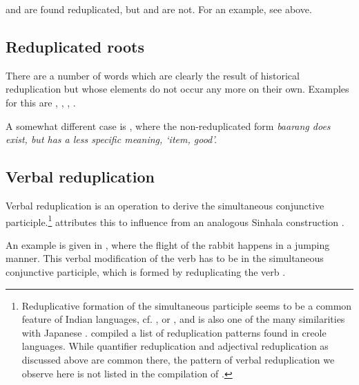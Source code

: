 
 and  are found reduplicated, but  and  are not. For an example, see  above.

\subsection{Reduplicated roots}\label{sec:wofo:Reduplicatedroots}
There are a number of words which are clearly the result of historical reduplication but whose elements do not occur any more on their own. Examples for this are 
,
,
,
.

A somewhat different case is , where the non-reduplicated form \em baarang \em does exist, but has a less specific meaning, `item, good'.


\subsection{Verbal reduplication}\label{sec:wofo:Verbalreduplication}
Verbal reduplication  is an operation to derive the simultaneous conjunctive participle.\footnote{Reduplicative
 formation of the simultaneous participle seems to be a common feature of Indian languages, cf. \citet[10,35]{Abbi1994}, or \citet{Singh2005redup}, and is also one of the many similarities with Japanese \citep{Shibasaki2005redup}. \citet{BakkerEtAl2005redup} compiled a list of reduplication patterns found in creole languages. While quantifier reduplication and adjectival reduplication as discussed above are common there, the pattern of verbal reduplication we observe here is not listed in the compilation of \citet{BakkerEtAl2005redup}.}
\citet[56]{Saldin2001} attributes this to influence from an analogous Sinhala construction \citep[cf.][88]{Garusinghe1962}.


An example is given in , where the flight of the rabbit happens in a jumping manner. This verbal modification of the verb  has to be in the simultaneous conjunctive participle, which is formed by reduplicating the verb .


